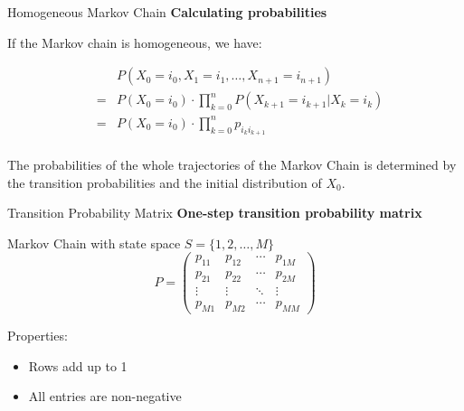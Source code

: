 \documentclass[8pt]{beamer}
\begin{document}
\begin{frame}{Homogeneous Markov Chain}
\textbf{Calculating probabilities}

\vspace{3mm}

If the Markov chain is homogeneous, we have:

\begin{eqnarray*}
&&P(X_0=i_0,X_1=i_1,\ldots,X_{n+1}=i_{n+1})\\
&=&\displaystyle{P(X_0=i_0) \cdot \prod_{k=0}^n P(X_{k+1}=i_{k+1}|X_k=i_k)}\\
&=&\displaystyle{P(X_0=i_0) \cdot \prod_{k=0}^n p_{i_k i_{k+1}}}\\
\end{eqnarray*}

\vspace{3mm}

The probabilities of the whole trajectories of the Markov Chain is determined by the transition probabilities and the initial distribution of $X_0$.
\end{frame}

\begin{frame}{Transition Probability Matrix}
\textbf{One-step transition probability matrix}
\vspace{3mm}

Markov Chain with state space $S=\{1,2,\ldots,M\}$
\begin{equation*}
P=\left( 
\begin{array}{cccc}
p_{11}&p_{12}& \cdots& p_{1M} \\
p_{21}&p_{22}& \cdots& p_{2M} \\
\vdots& \vdots& \ddots& \vdots \\
p_{M1}&p_{M2}& \cdots& p_{MM}
\end{array} \right)
\end{equation*}

Properties:
\begin{itemize}
\item Rows add up to 1
\item All entries are non-negative
\end{itemize}
\end{frame}
\end{document}

